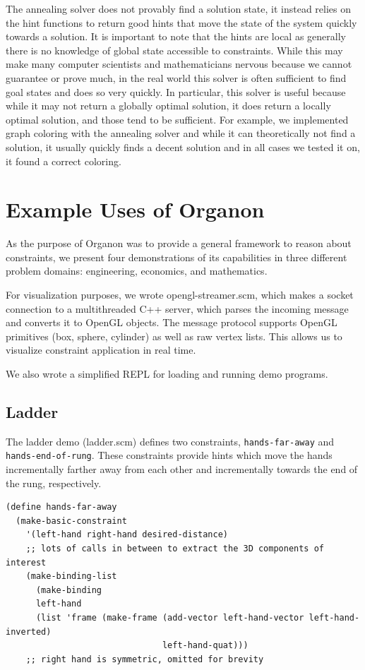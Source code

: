 \documentclass[12pt,a4paper]{article}
\begin{document}
The annealing solver does not provably find a solution state, it instead relies on the hint functions to return good hints that move the state of the system quickly towards a solution.  It is important to note that the hints are local as generally there is no knowledge of global state accessible to constraints.  While this may make many computer scientists and mathematicians nervous because we cannot guarantee or prove much, in the real world this solver is often sufficient to find goal states and does so very quickly.  In particular, this solver is useful because while it may not return a globally optimal solution, it does return a locally optimal solution, and those tend to be sufficient.  For example, we implemented graph coloring with the annealing solver and while it can theoretically not find a solution, it usually quickly finds a decent solution and in all cases we tested it on, it found a correct coloring.

\section{Example Uses of Organon}

As the purpose of Organon was to provide a general framework to reason about constraints, we present four demonstrations of its capabilities in three different problem domains: engineering, economics, and mathematics.

For visualization purposes, we wrote opengl-streamer.scm, which makes a socket connection to a multithreaded C++ server, which parses the incoming message and converts it to OpenGL objects. The message protocol supports OpenGL primitives (box, sphere, cylinder) as well as raw vertex lists. This allows us to visualize constraint application in real time. 

We also wrote a simplified REPL for loading and running demo programs.
\subsection{Ladder}
The ladder demo (ladder.scm) defines two constraints, \texttt{hands-far-away} and \texttt{hands-end-of-rung}. These constraints provide hints which move the hands incrementally farther away from each other and incrementally towards the end of the rung, respectively.  
\begin{lstlisting}
(define hands-far-away
  (make-basic-constraint
    '(left-hand right-hand desired-distance)
	;; lots of calls in between to extract the 3D components of interest
    (make-binding-list
      (make-binding
      left-hand
      (list 'frame (make-frame (add-vector left-hand-vector left-hand-inverted)
                               left-hand-quat)))
	;; right hand is symmetric, omitted for brevity
\end{lstlisting}
\end{document}
